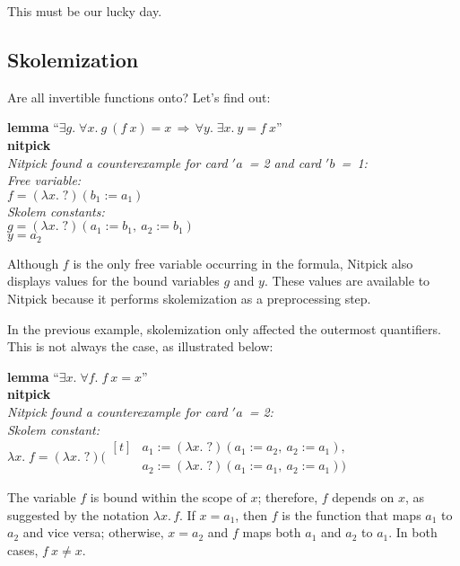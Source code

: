 \documentclass[a4paper,12pt]{article}
\def\unk{{?}}
\def\undef{(\lambda x.\; \unk)}
\begin{document}
This must be our lucky day.

\subsection{Skolemization}
\label{skolemization}

Are all invertible functions onto? Let's find out:

\prew
\textbf{lemma} ``$\exists g.\; \forall x.~g~(f~x) = x
 \,\Longrightarrow\, \forall y.\; \exists x.~y = f~x$'' \\
\textbf{nitpick} \\[2\smallskipamount]
\slshape
Nitpick found a counterexample for \textit{card} $'a$~= 2 and \textit{card} $'b$~=~1: \\[2\smallskipamount]
\hbox{}\qquad Free variable: \nopagebreak \\
\hbox{}\qquad\qquad $f = \undef{}(b_1 := a_1)$ \\
\hbox{}\qquad Skolem constants: \nopagebreak \\
\hbox{}\qquad\qquad $g = \undef{}(a_1 := b_1,\> a_2 := b_1)$ \\
\hbox{}\qquad\qquad $y = a_2$
\postw

Although $f$ is the only free variable occurring in the formula, Nitpick also
displays values for the bound variables $g$ and $y$. These values are available
to Nitpick because it performs skolemization as a preprocessing step.

In the previous example, skolemization only affected the outermost quantifiers.
This is not always the case, as illustrated below:

\prew
\textbf{lemma} ``$\exists x.\; \forall f.\; f~x = x$'' \\
\textbf{nitpick} \\[2\smallskipamount]
\slshape
Nitpick found a counterexample for \textit{card} $'a$~= 2: \\[2\smallskipamount]
\hbox{}\qquad Skolem constant: \nopagebreak \\
\hbox{}\qquad\qquad $\lambda x.\; f =
    \undef{}(\!\begin{aligned}[t]
    & a_1 := \undef{}(a_1 := a_2,\> a_2 := a_1), \\[-2pt]
    & a_2 := \undef{}(a_1 := a_1,\> a_2 := a_1))\end{aligned}$
\postw

The variable $f$ is bound within the scope of $x$; therefore, $f$ depends on
$x$, as suggested by the notation $\lambda x.\,f$. If $x = a_1$, then $f$ is the
function that maps $a_1$ to $a_2$ and vice versa; otherwise, $x = a_2$ and $f$
maps both $a_1$ and $a_2$ to $a_1$. In both cases, $f~x \not= x$.
\end{document}
